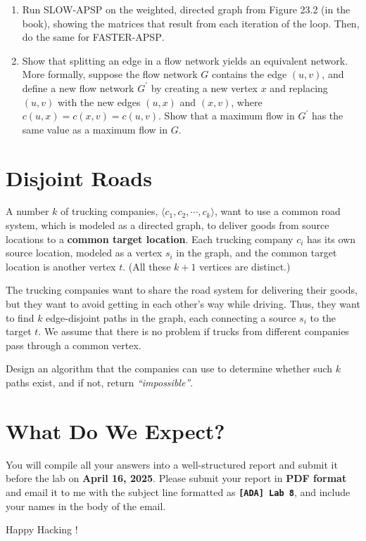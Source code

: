 \documentclass[11pt]{article}
\begin{document}
\begin{tcolorbox}[title=Exercises]
    \begin{enumerate}
    \item Run \textsc{SLOW-APSP} on the weighted, directed graph from Figure 23.2 (in the book), showing the matrices that result from each iteration of the loop. Then, do the same for \textsc{FASTER-APSP}.

    \item Show that splitting an edge in a flow network yields an equivalent network. More formally, suppose the flow network $G$ contains the edge $(u, v)$, and define a new flow network $G^\prime$ by creating a new vertex $x$ and replacing $(u, v)$ with the new edges $(u, x)$ and $(x, v)$, where $c(u, x) = c(x, v) = c(u, v)$. Show that a maximum flow in $G^\prime$ has the same value as a maximum flow in $G$.
    \end{enumerate}
\end{tcolorbox}

\section{Disjoint Roads}
A number $k$ of trucking companies, $\langle c_1, c_2, \cdots, c_k\rangle$, want to use a common road system, which is modeled as a directed graph, to deliver goods from source locations to a \textbf{common target location}. Each trucking company $c_i$ has its own source location, modeled as a vertex $s_i$ in the graph, and the common target location is another vertex $t$. (All these $k + 1$ vertices are distinct.)

The trucking companies want to share the road system for delivering their goods, but they want to avoid getting in each other's way while driving. Thus, they want to find $k$ edge-disjoint paths in the graph, each connecting a source $s_i$ to the target $t$. We assume that there is no problem if trucks from different companies pass through a common vertex.

Design an algorithm that the companies can use to determine whether such $k$ paths exist, and if not, return \textit{``impossible''}.

\section{What Do We Expect?}
You will compile all your answers into a well-structured report and submit it before the lab on \textbf{April 16, 2025}. Please submit your report in \textbf{PDF format} and email it to me with the subject line formatted as {\LARGE \textbf{\texttt{[ADA] Lab 8}}}, and include your names in the body of the email.

\vspace{5mm}
Happy Hacking !
\end{document}
